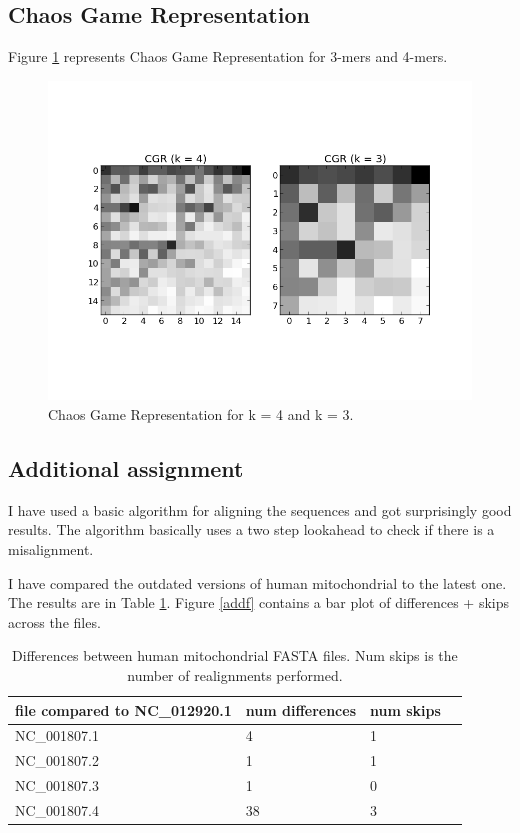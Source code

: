 \documentclass[a4paper,11pt]{article}
\begin{document}
\subsection{Chaos Game Representation}
Figure \ref{cgr} represents Chaos Game Representation for 3-mers and 4-mers.
\begin{figure}[h!]
\begin{center}
\includegraphics[scale=0.6]{4_cgr.png}
\caption{Chaos Game Representation for k = 4 and k = 3.}
\label{cgr}
\end{center}
\end{figure}

\subsection{Additional assignment}
I have used a basic algorithm for aligning the sequences and got surprisingly good results. The algorithm basically uses a two step lookahead to check if there is a misalignment.

I have compared the outdated versions of human mitochondrial to the latest one. The results are in Table \ref{add}. Figure \ref{addf} contains a bar plot of differences + skips across the files.

\begin{table}[htbp]
\caption{Differences between human mitochondrial FASTA files. Num skips is the number of realignments performed.}
\label{add}
\begin{center}
\begin{tabular}{lllp{4cm}}
\hline
file compared to NC\_012920.1 & num differences  & num skips \\
\hline
NC\_001807.1 & 4 & 1\\
NC\_001807.2 & 1 & 1\\
NC\_001807.3 & 1 & 0\\
NC\_001807.4 & 38 & 3\\
\hline
\end{tabular}
\end{center}
\end{table}
\end{document}
